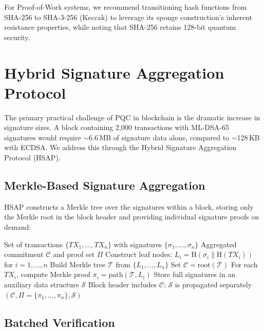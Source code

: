 \documentclass[12pt, a4paper, twocolumn]{article}
\begin{document}
For Proof-of-Work systems, we recommend transitioning hash functions from SHA-256 to SHA-3-256 (Keccak) to leverage its sponge construction's inherent resistance properties, while noting that SHA-256 retains 128-bit quantum security.

\section{Hybrid Signature Aggregation Protocol}
\label{sec:hsap}

The primary practical challenge of PQC in blockchain is the dramatic increase in signature sizes. A block containing 2,000 transactions with ML-DSA-65 signatures would require $\sim$6.6\,MB of signature data alone, compared to $\sim$128\,KB with ECDSA. We address this through the Hybrid Signature Aggregation Protocol (HSAP).

\subsection{Merkle-Based Signature Aggregation}

HSAP constructs a Merkle tree over the signatures within a block, storing only the Merkle root in the block header and providing individual signature proofs on demand:

\begin{algorithm}[H]
\caption{HSAP Signature Aggregation}
\label{alg:hsap}
\begin{algorithmic}[1]
\REQUIRE Set of transactions $\{TX_1, \ldots, TX_n\}$ with signatures $\{\sigma_1, \ldots, \sigma_n\}$
\ENSURE Aggregated commitment $\mathcal{C}$ and proof set $\Pi$
\STATE Construct leaf nodes: $L_i = \text{H}(\sigma_i \| \text{H}(TX_i))$ for $i = 1, \ldots, n$
\STATE Build Merkle tree $\mathcal{T}$ from $\{L_1, \ldots, L_n\}$
\STATE Set $\mathcal{C} = \text{root}(\mathcal{T})$ 
\STATE For each $TX_i$, compute Merkle proof $\pi_i = \text{path}(\mathcal{T}, L_i)$
\STATE Store full signatures in an auxiliary data structure $\mathcal{S}$
\STATE Block header includes $\mathcal{C}$; $\mathcal{S}$ is propagated separately
\RETURN $(\mathcal{C}, \Pi = \{\pi_1, \ldots, \pi_n\}, \mathcal{S})$
\end{algorithmic}
\end{algorithm}

\subsection{Batched Verification}
\end{document}
